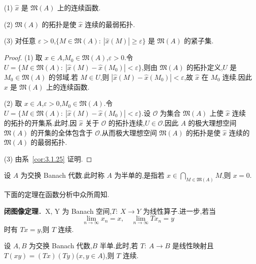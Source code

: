 \begin{proposition}\label{prop:3.1.28}

(1) $\hat{x}$ 是 $\mathfrak{M}(A)$ 上的连续函数.

(2) $\mathfrak{M}(A)$ 的拓扑是使 $\hat{x}$ 连续的最弱拓扑.

(3) 对任意 $\varepsilon > 0$,$\{M \in \mathfrak{M}(A):\ |\hat{x}(M)| \geq \varepsilon\}$ 是 $\mathfrak{M}(A)$ 的紧子集.
\end{proposition}

\begin{proof}
(1) 取 $x \in A$,$M_{0} \in \mathfrak{M}(A)$,$\varepsilon > 0$.令 $U = \{M \in \mathfrak{M}(A):\ |\hat{x}(M) - \hat{x}(M_{0})| < \varepsilon\}$,则由 $\mathfrak{M}(A)$ 的拓扑定义,$U$ 是 $M_{0} \in \mathfrak{M}(A)$ 的邻域.若 $M \in U$,则 $|\hat{x}(M) - \hat{x}(M_{0})| < \varepsilon$,故 $\hat{x}$ 在 $M_{0}$ 连续.因此 $\hat{x}$ 是 $\mathfrak{M}(A)$ 上的连续函数.

(2) 取 $x \in A$,$\varepsilon > 0$,$M_{0} \in \mathfrak{M}(A)$.令 $U = \{M \in \mathfrak{M}(A):\ |\hat{x}(M) - \hat{x}(M_{0})| < \varepsilon\}$.设 $\mathcal{O}$ 为集合 $\mathfrak{M}(A)$ 上使 $\hat{x}$ 连续的拓扑的开集系.此时,因 $\hat{x}$ 关于 $\mathcal{O}$ 的拓扑连续,$U \in \mathcal{O}$.因此 $A$ 的极大理想空间 $\mathfrak{M}(A)$ 的开集的全体包含于 $\mathcal{O}$.从而极大理想空间 $\mathfrak{M}(A)$ 的拓扑是使 $\hat{x}$ 连续的 $\mathfrak{M}(A)$ 的最弱拓扑.

(3) 由系~\ref{cor:3.1.25} 证明.
\end{proof}

\begin{definition}\label{def:3.1.29}
设 $A$ 为交换 Banach 代数.此时称 $A$ 为半单的,是指若 $x \in \bigcap_{M \in \mathfrak{M}(A)} M$,则 $x = 0$.
\end{definition}

下面的定理在函数分析中众所周知.

\textbf{闭图像定理}．X, Y 为 Banach 空间,$T:\ X \to Y$ 为线性算子.进一步,若当
\begin{equation*}
\lim_{n \to \infty} x_{n} = x, \quad \lim_{n \to \infty} Tx_{n} = y
\end{equation*}
时有 $Tx = y$,则 $T$ 连续.

\begin{theorem}\label{thm:3.1.30}
设 $A, B$ 为交换 Banach 代数,$B$ 半单.此时,若 $T:\ A \to B$ 是线性映射且 $T(xy) = (Tx)(Ty)$($x, y \in A$),则 $T$ 连续.
\end{theorem}

